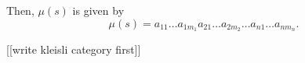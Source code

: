 \documentclass[11pt]{article}
\theoremstyle{nonumberplain}
\begin{document}
Then, $\mu(s)$ is given by
\begin{equation}
\mu(s) = a_{11} \dots a_{1 m_1} a_{21} \dots a_{2 m_2} \dots a_{n1} \dots a_{n m_n}.
\end{equation}

[[write kleisli category first]]



\end{document}
